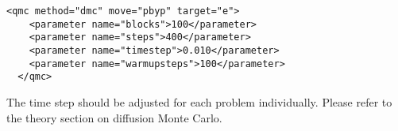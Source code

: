 \begin{itemize}







\end{itemize}

\begin{lstlisting}[caption=The following is an example of a very simple DMC section. ]
  <qmc method="dmc" move="pbyp" target="e">
    <parameter name="blocks">100</parameter>
    <parameter name="steps">400</parameter>
    <parameter name="timestep">0.010</parameter>
    <parameter name="warmupsteps">100</parameter>
  </qmc>
\end{lstlisting}
The time step should be adjusted for each problem individually.  Please refer to the theory section
on diffusion Monte Carlo.


